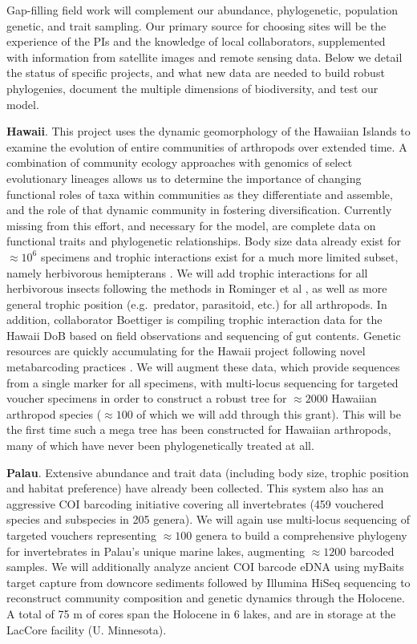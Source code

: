 \documentclass[11pt]{article}
\begin{document}
Gap-filling field work will complement our abundance, phylogenetic,
population genetic, and trait sampling. Our primary source for
choosing sites will be the experience of the PIs and the knowledge of
local collaborators, supplemented with information from satellite
images and remote sensing data. Below we detail the status of specific
projects, and what new data are needed to build robust phylogenies,
document the multiple dimensions of biodiversity, and test our model.

\textbf{Hawaii}. This project uses the dynamic geomorphology of the
Hawaiian Islands to examine the evolution of entire communities of
arthropods over extended time. A combination of community ecology
approaches with genomics of select evolutionary lineages allows us to
determine the importance of changing functional roles of taxa within
communities as they differentiate and assemble, and the role of that
dynamic community in fostering diversification. Currently missing from
this effort, and necessary for the model, are complete data on
functional traits and phylogenetic relationships. Body size data
already exist for $\approx 10^6$ specimens and trophic interactions
exist for a much more limited subset, namely herbivorous hemipterans
\cite{Rominger2015-kb}. We will add trophic interactions for all
herbivorous insects following the methods in Rominger et al
\cite{Rominger2015-kb}, as well as more general trophic position
(e.g.~predator, parasitoid, etc.) for all arthropods. In addition,
collaborator Boettiger is compiling trophic interaction data for the
Hawaii DoB based on field observations and sequencing of gut contents.
Genetic resources are quickly accumulating for the Hawaii project
following novel metabarcoding practices
\cite{Krehenwinkel2017-zk}. We will augment these data, which provide
sequences from a single marker for all specimens, with multi-locus
sequencing for targeted voucher specimens in order to construct a
robust tree for $\approx 2000$ Hawaiian arthropod species
($\approx 100$ of which we will add through this grant). This will be
the first time such a mega tree has been constructed for Hawaiian
arthropods, many of which have never been phylogenetically treated at
all.

\textbf{Palau}. Extensive abundance and trait data (including body
size, trophic position and habitat preference) have already been
collected. This system also has an aggressive COI barcoding initiative
covering all invertebrates (459 vouchered species and subspecies in
205 genera). We will again use multi-locus sequencing of targeted
vouchers representing $\approx 100$ genera to build a comprehensive
phylogeny for invertebrates in Palau's unique marine lakes, augmenting
$\approx 1200$ barcoded samples. We will additionally analyze ancient
COI barcode eDNA using myBaits target capture from downcore sediments
followed by Illumina HiSeq sequencing to reconstruct community
composition and genetic dynamics through the Holocene. A total of 75 m
of cores span the Holocene in 6 lakes, and are in storage at the
LacCore facility (U. Minnesota).
\end{document}
